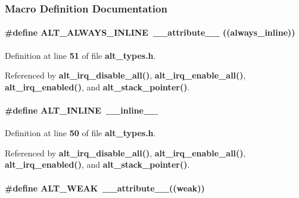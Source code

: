 \subsubsection{Macro Definition Documentation}
\paragraph[{A\+L\+T\+\_\+\+A\+L\+W\+A\+Y\+S\+\_\+\+I\+N\+L\+I\+NE}]{\setlength{\rightskip}{0pt plus 5cm}\#define A\+L\+T\+\_\+\+A\+L\+W\+A\+Y\+S\+\_\+\+I\+N\+L\+I\+NE~{\bf \+\_\+\+\_\+attribute\+\_\+\+\_\+} ((always\+\_\+inline))}\label{alt__types_8h_a124ba0ef1c6c98924cb3b8ce438d3105}


Definition at line {\bf 51} of file {\bf alt\+\_\+types.\+h}.



Referenced by {\bf alt\+\_\+irq\+\_\+disable\+\_\+all()}, {\bf alt\+\_\+irq\+\_\+enable\+\_\+all()}, {\bf alt\+\_\+irq\+\_\+enabled()}, and {\bf alt\+\_\+stack\+\_\+pointer()}.

\paragraph[{A\+L\+T\+\_\+\+I\+N\+L\+I\+NE}]{\setlength{\rightskip}{0pt plus 5cm}\#define A\+L\+T\+\_\+\+I\+N\+L\+I\+NE~\+\_\+\+\_\+inline\+\_\+\+\_\+}\label{alt__types_8h_a9b32d20a6d5b051b3cbdeb45d0273ded}


Definition at line {\bf 50} of file {\bf alt\+\_\+types.\+h}.



Referenced by {\bf alt\+\_\+irq\+\_\+disable\+\_\+all()}, {\bf alt\+\_\+irq\+\_\+enable\+\_\+all()}, {\bf alt\+\_\+irq\+\_\+enabled()}, and {\bf alt\+\_\+stack\+\_\+pointer()}.

\paragraph[{A\+L\+T\+\_\+\+W\+E\+AK}]{\setlength{\rightskip}{0pt plus 5cm}\#define A\+L\+T\+\_\+\+W\+E\+AK~{\bf \+\_\+\+\_\+attribute\+\_\+\+\_\+}((weak))}\label{alt__types_8h_a40045c23a83e4c323f12796c67289501}


